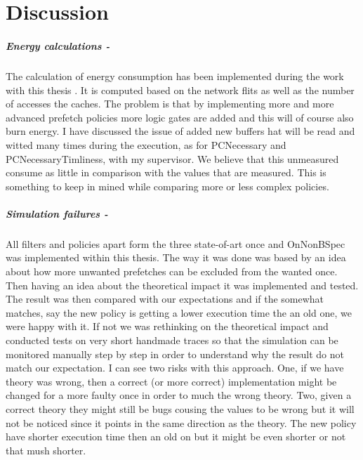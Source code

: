 \chapter{Discussion}
\label{chap:discussion}

\paragraph{Energy calculations -} The calculation of energy consumption has been implemented during the work with this thesis \fixme. It is computed based on the network flits as well as the number of accesses the caches. The problem is that by implementing more and more advanced prefetch policies more logic gates are added and this will of course also burn energy. I have discussed the issue of added new buffers hat will be read and witted many times during the execution, as for PCNecessary and PCNecessaryTimliness, with my supervisor. We believe that this unmeasured consume as little in comparison with the values that are measured. This is something to keep in mined while comparing more or less complex policies. 

\paragraph{Simulation failures -} All filters and policies apart form the three state-of-art once and OnNonBSpec was implemented within this thesis. The way it was done was based by an idea about how more unwanted prefetches can be excluded from the wanted once. Then having an idea about the theoretical impact it was implemented and tested. The result was then compared with our expectations and if the somewhat matches, say the new policy is getting a lower execution time the an old one, we were happy with it. If not we was rethinking on the theoretical impact and conducted tests on very short handmade traces so that the simulation can be monitored manually step by step in order to understand why the result do not match our expectation. I can see two risks with this approach. One, if we have theory was wrong, then a correct (or more correct) implementation might be changed for a more faulty once in order to much the wrong theory. Two, given a correct theory they might still be bugs cousing the values to be wrong but it will not be noticed since it points in the same direction as the theory. The new policy have shorter execution time then an old on but it might be even shorter or not that mush shorter.